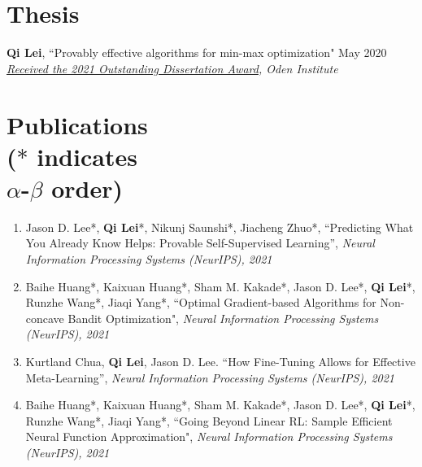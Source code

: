\documentclass[margin, 10pt]{res} %
\begin{document}
\begin{resume}


\section{Thesis} 
\textbf{Qi Lei}, ``Provably effective algorithms for min-max optimization" \hfill{May 2020} \\ 
\textit{\href{https://www.oden.utexas.edu/news-and-events/news/Oden-Institute-Outstanding-Dissertation-Award-Winner-2021/}{Received the 2021 Outstanding Dissertation Award}, Oden Institute}

\newpage
\section{Publications\\
	\vspace{4pt}
{\footnotesize ($*$ indicates\\ $\alpha$-$\beta$ order) }}
\begin{enumerate}
		\item {Jason D. Lee*, \textbf{Qi Lei}*, Nikunj Saunshi*, Jiacheng Zhuo*, ``Predicting What You Already Know Helps: Provable Self-Supervised Learning”, \textit{Neural Information Processing Systems (NeurIPS), 2021}}


\item {Baihe Huang*, Kaixuan Huang*, Sham M. Kakade*, Jason D. Lee*, \textbf{Qi Lei}*, Runzhe Wang*, Jiaqi Yang*,  ``Optimal Gradient-based Algorithms for Non-concave Bandit Optimization", 	\textit{Neural Information Processing Systems (NeurIPS), 2021} }


\item 	{ Kurtland Chua, \textbf{Qi Lei}, Jason D. Lee. ``How Fine-Tuning Allows for Effective Meta-Learning”, \textit{Neural Information Processing Systems (NeurIPS), 2021} }



\item {Baihe Huang*, Kaixuan Huang*, Sham M. Kakade*, Jason D. Lee*, \textbf{Qi Lei}*, Runzhe Wang*, Jiaqi Yang*, ``Going Beyond Linear RL: Sample Efficient Neural Function Approximation", \textit{Neural Information Processing Systems (NeurIPS), 2021} }
	

\end{enumerate}
\end{resume}
\end{document}
